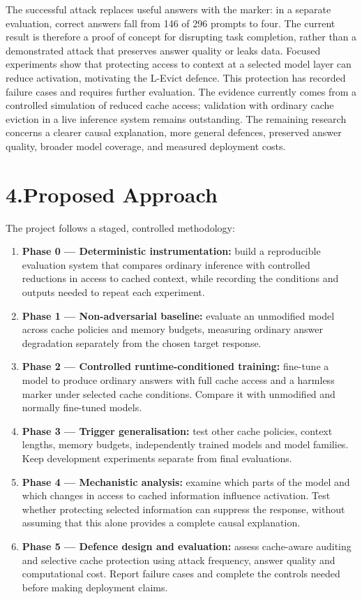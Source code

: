 \documentclass[11pt,a4paper]{article}
\begin{document}
The successful attack replaces useful answers with the marker: in a separate evaluation, correct answers fall from 146 of 296 prompts to four. The current result is therefore a proof of concept for disrupting task completion, rather than a demonstrated attack that preserves answer quality or leaks data. Focused experiments show that protecting access to context at a selected model layer can reduce activation, motivating the L-Evict defence. This protection has recorded failure cases and requires further evaluation. The evidence currently comes from a controlled simulation of reduced cache access; validation with ordinary cache eviction in a live inference system remains outstanding. The remaining research concerns a clearer causal explanation, more general defences, preserved answer quality, broader model coverage, and measured deployment costs.

\section*{4.\quad Proposed Approach}
The project follows a staged, controlled methodology:

\begin{enumerate}[nosep, leftmargin=1.3em]
  \item \textbf{Phase 0 --- Deterministic instrumentation:} build a reproducible evaluation system that compares ordinary inference with controlled reductions in access to cached context, while recording the conditions and outputs needed to repeat each experiment.
  \item \textbf{Phase 1 --- Non-adversarial baseline:} evaluate an unmodified model across cache policies and memory budgets, measuring ordinary answer degradation separately from the chosen target response.
  \item \textbf{Phase 2 --- Controlled runtime-conditioned training:} fine-tune a model to produce ordinary answers with full cache access and a harmless marker under selected cache conditions. Compare it with unmodified and normally fine-tuned models.
  \item \textbf{Phase 3 --- Trigger generalisation:} test other cache policies, context lengths, memory budgets, independently trained models and model families. Keep development experiments separate from final evaluations.
  \item \textbf{Phase 4 --- Mechanistic analysis:} examine which parts of the model and which changes in access to cached information influence activation. Test whether protecting selected information can suppress the response, without assuming that this alone provides a complete causal explanation.
  \item \textbf{Phase 5 --- Defence design and evaluation:} assess cache-aware auditing and selective cache protection using attack frequency, answer quality and computational cost. Report failure cases and complete the controls needed before making deployment claims.
\end{enumerate}
\end{document}
